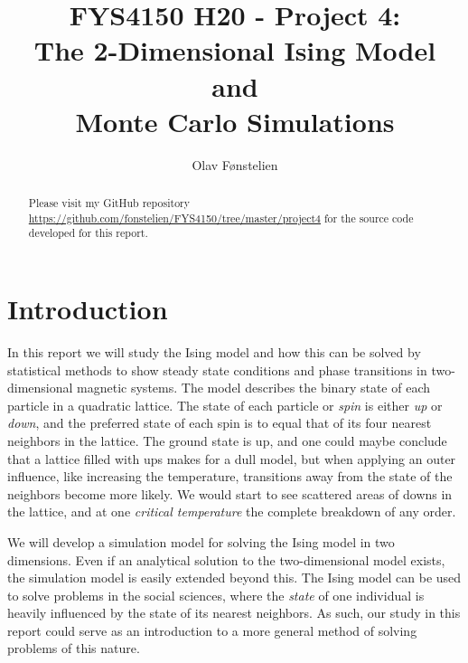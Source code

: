 \documentclass[]{article}
\title{FYS4150 H20 - Project 4:\\The 2-Dimensional Ising Model and \\Monte Carlo Simulations}
\author{Olav Fønstelien}
\begin{document}
\maketitle

\begin{abstract}


Please visit my GitHub repository \url{https://github.com/fonstelien/FYS4150/tree/master/project4} for the source code developed for this report.

\end{abstract}

\section{Introduction} \label{intro}

In this report we will study the Ising model and how this can be solved by statistical methods to show steady state conditions and phase transitions in two-dimensional magnetic systems. The model describes the binary state of each particle in a quadratic lattice. The state of each particle or \textit{spin} is either \textit{up} or \textit{down}, and the preferred state of each spin is to equal that of its four nearest neighbors in the lattice. The ground state is up, and one could maybe conclude that a lattice filled with ups makes for a dull model, but when applying an outer influence, like increasing the temperature, transitions away from the state of the neighbors become more likely. We would start to see scattered areas of downs in the lattice, and at one \textit{critical temperature} the complete breakdown of any order.

We will develop a simulation model for solving the Ising model in two dimensions. Even if an analytical solution to the two-dimensional model exists, the simulation model is easily extended beyond this. The Ising model can be used to solve problems in the social sciences, where the \textit{state} of one individual is heavily influenced by the state of its nearest neighbors. As such, our study in this report could serve as an introduction to a more general method of solving problems of this nature.
\end{document}
